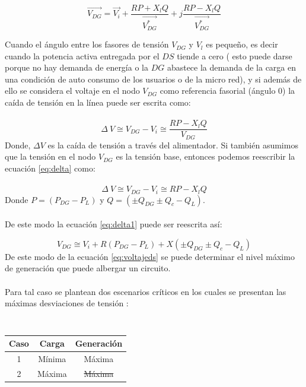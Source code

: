 \documentclass[12pt, letterpaper]{report}
\providecommand{\DIFaddtex}[1]{{\protect\color{blue}\uwave{#1}}} %
\providecommand{\DIFdeltex}[1]{{\protect\color{red}\sout{#1}}}                      %
\providecommand{\DIFaddbegin}{} %
\providecommand{\DIFaddend}{} %
\providecommand{\DIFdelbegin}{} %
\providecommand{\DIFdelend}{} %
\providecommand{\DIFaddFL}[1]{\DIFadd{#1}} %
\providecommand{\DIFdelFL}[1]{\DIFdel{#1}} %
\providecommand{\DIFaddbeginFL}{} %
\providecommand{\DIFaddendFL}{} %
\providecommand{\DIFdelbeginFL}{} %
\providecommand{\DIFdelendFL}{} %
\providecommand{\DIFadd}[1]{\texorpdfstring{\DIFaddtex{#1}}{#1}} %
\providecommand{\DIFdel}[1]{\texorpdfstring{\DIFdeltex{#1}}{}} %
\begin{document}
\DIFaddend \begin{equation}
\overrightarrow{V_{DG}}= \overrightarrow{V_{i}} + \dfrac{RP + X_{l}Q}{\overrightarrow{V_{DG}^{*}}} + j\dfrac{RP - X_{l}Q }{\overrightarrow{V_{DG}^{*}}}
\end{equation}

Cuando el ángulo entre los fasores de tensión  $V_{DG}$  y $V_{l}$ es pequeño, es decir cuando la potencia activa entregada por el \DIFdelbegin \DIFdel{$DS$ }\DIFdelend \DIFaddbegin \DIFadd{DS }\DIFaddend tiende a cero \cite{Akagi2017} (  esto puede darse porque no hay demanda de energía o la $DG$ abastece la demanda de la carga en una condición de auto consumo de los usuarios o de la micro red), y si además de ello se considera el voltaje en el nodo $V_{DG}$ como referencia fasorial (ángulo 0) la caída de tensión en la línea puede ser escrita como:\\\\
\begin{equation}
\Delta\ V \cong V_{DG} - V_{i}\cong \dfrac{RP - X_{l}Q }{V_{DG}}
\label{eq:delta} 
\end{equation}
Donde, $\Delta V$ es la caída de tensión a través del alimentador. Si también asumimos que la tensión en el nodo  $V_{DG}$  es la tensión base, entonces podemos reescribir la ecuación \ref{eq:delta} como:\\\\
\begin{equation}
\Delta\ V \cong V_{DG} - V_{i}\cong RP - X_{l}Q 
\label{eq:delta1} 
\end{equation}
Donde $P=(P_{DG}-P_{L})$  y  $ Q = (\pm Q_{DG} \pm Q_{c} - Q_{L})$.\\\\
De este modo la ecuación \ref{eq:delta1} puede ser reescrita así:

\begin{equation}
V_{DG} \cong V_{i} + R (P_{DG} - P_{L}) + X(\pm Q_{DG} \pm Q_{c} - Q_{L})
\label{eq:voltajeds}
\end{equation}
De este modo  de la ecuación \ref{eq:voltajeds} se puede determinar  el nivel máximo de generación que puede  albergar un circuito.\\\\
Para tal caso se plantean dos escenarios críticos en los cuales se presentan las máximas desviaciones de tensión \cite{Elkhatib2011a}:\\\\

\DIFaddbegin \begin{table}[h]
	\centering
	\caption{\DIFaddFL{Escenarios de tensión }}
	\label{tab:escenarios_v}
	\vspace{0.5 cm}
\DIFaddendFL \begin{tabular}{|c|c|c|}
    \hline 
    Caso 	& Carga 	& Generación \\\hline
    1 		& Mínima	& Máxima \\\hline
    2		& Máxima	& \DIFdelbeginFL \DIFdelFL{Máxima }\DIFdelendFL \DIFaddbeginFL \DIFaddFL{Mínima }\DIFaddendFL \\
    \hline
\end{tabular}
\DIFaddbeginFL \end{table}
\DIFaddend 
\end{document}

